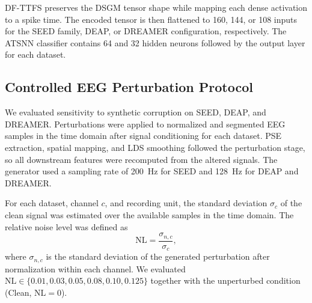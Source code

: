 ﻿\documentclass[12pt]{article}
\begin{document}
DF-TTFS preserves the DSGM tensor shape while mapping each dense activation to a spike time. The encoded tensor is then flattened to 160, 144, or 108 inputs for the SEED family, DEAP, or DREAMER configuration, respectively. The ATSNN classifier contains 64 and 32 hidden neurons followed by the output layer for each dataset.

\subsection{Controlled EEG Perturbation Protocol}\label{supp:controlled_perturbations}

We evaluated sensitivity to synthetic corruption on SEED, DEAP, and DREAMER. Perturbations were applied to normalized and segmented EEG samples in the time domain after signal conditioning for each dataset. PSE extraction, spatial mapping, and LDS smoothing followed the perturbation stage, so all downstream features were recomputed from the altered signals. The generator used a sampling rate of 200~Hz for SEED and 128~Hz for DEAP and DREAMER.

For each dataset, channel $c$, and recording unit, the standard deviation $\sigma_c$ of the clean signal was estimated over the available samples in the time domain. The relative noise level was defined as
\begin{equation}
\mathrm{NL}=\frac{\sigma_{n,c}}{\sigma_c},
\label{eq:relative_noise_level}
\end{equation}
where $\sigma_{n,c}$ is the standard deviation of the generated perturbation after normalization within each channel. We evaluated $\mathrm{NL}\in\{0.01,0.03,0.05,0.08,0.10,0.125\}$ together with the unperturbed condition (Clean, $\mathrm{NL}=0$).
\end{document}
